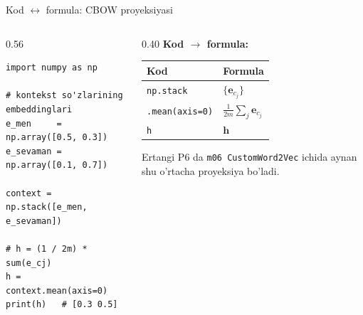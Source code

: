 \documentclass[aspectratio=169,11pt]{beamer}
\begin{document}
\begin{frame}[fragile]{Kod $\leftrightarrow$ formula: CBOW proyeksiyasi}
  \begin{columns}[T]
    \begin{column}{0.56\textwidth}
\begin{lstlisting}
import numpy as np

# kontekst so'zlarining embeddinglari
e_men     = np.array([0.5, 0.3])
e_sevaman = np.array([0.1, 0.7])

context = np.stack([e_men, e_sevaman])

# h = (1 / 2m) * sum(e_cj)
h = context.mean(axis=0)
print(h)   # [0.3 0.5]
\end{lstlisting}
    \end{column}
    \begin{column}{0.40\textwidth}
      \textbf{Kod $\to$ formula:}\\[3pt]
      \footnotesize
      \begin{tabular}{p{2.0cm}p{2.0cm}}
        \toprule
        Kod & Formula \\
        \midrule
        \texttt{np.stack} & $\{\mathbf{e}_{c_j}\}$ \\
        \texttt{.mean(axis=0)} & $\tfrac{1}{2m}\sum_j \mathbf{e}_{c_j}$ \\
        \texttt{h} & $\mathbf{h}$ \\
        \bottomrule
      \end{tabular}
      \vspace{4pt}
      \begin{tcolorbox}[okbox,top=2pt,bottom=2pt]
        \footnotesize
        Ertangi P6 da \texttt{m06 CustomWord2Vec} ichida aynan shu o'rtacha
        proyeksiya bo'ladi.
      \end{tcolorbox}
    \end{column}
  \end{columns}
\end{frame}
\end{document}
